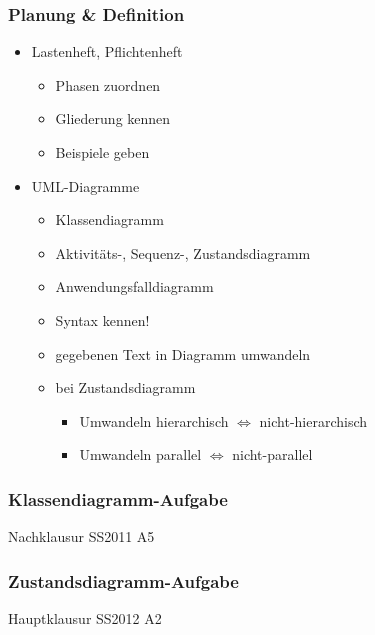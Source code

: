 \documentclass[18pt]{beamer}
\begin{document}
	\begin{frame}
		\frametitle{Planung \& Definition}
		\begin{itemize}
			\item Lastenheft, Pflichtenheft \pause
			\begin{itemize}
				\item Phasen zuordnen \pause
				\item Gliederung kennen \pause
				\item Beispiele geben \pause
			\end{itemize}
			\item UML-Diagramme \pause
			\begin{itemize}
				\item Klassendiagramm \pause
				\item Aktivitäts-, Sequenz-, Zustandsdiagramm \pause 
				\item Anwendungsfalldiagramm \pause
				\item Syntax kennen! \pause
				\item gegebenen Text in Diagramm umwandeln \pause
				\item bei Zustandsdiagramm
				\begin{itemize}
					\item Umwandeln hierarchisch $\Leftrightarrow$ nicht-hierarchisch 
					\item Umwandeln parallel $\Leftrightarrow$ nicht-parallel
				\end{itemize}
			\end{itemize}
		\end{itemize}
	\end{frame}

	\begin{frame}
		\frametitle{Klassendiagramm-Aufgabe}
		\begin{huge}
				\centering Nachklausur SS2011 A5
		\end{huge}
	\end{frame}

	\begin{frame}
		\frametitle{Zustandsdiagramm-Aufgabe}
		\begin{huge}
			 	\centering Hauptklausur SS2012 A2
		\end{huge}
	\end{frame}
\end{document}
